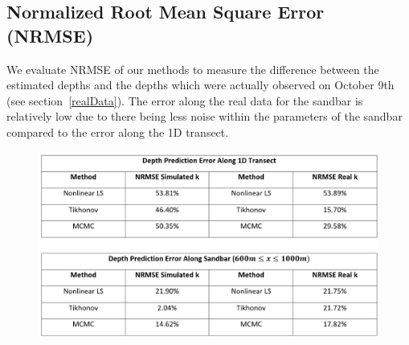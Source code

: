 \subsection{Normalized Root Mean Square Error (NRMSE)}
We evaluate NRMSE of our methods to measure the difference between the estimated depths and the depths which were actually observed on October 9th (see section~\ref{realData}). The error along the real data for the sandbar is relatively low due to there being less noise within the parameters of the sandbar compared to the error along the 1D transect.

\begin{figure}[h]
		\centering
		\includegraphics[width=0.80\linewidth]{img/NRMSE_Chart.png}
\end{figure}
		